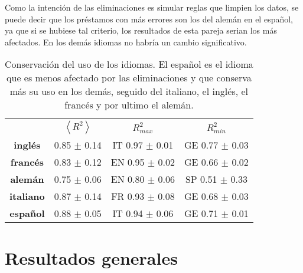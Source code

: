 Como la intención de las eliminaciones es simular reglas que limpien los datos, se puede decir que los préstamos con más errores son los del alemán en el español, ya que si se hubiese tal criterio, los resultados de esta pareja serian los más afectados. En los demás idiomas no habría un cambio significativo. 


 


 



\begin{table}
	\centering
	\begin{tabular}{cccc}
		\textbf{} & \textbf{$\left \langle R^{2} \right \rangle$} & \textbf{$R^{2}_{max}$} & \textbf{$R^{2}_{min}$} \\
		\textbf{inglés}   & 0.85 $\pm$ 0.14   &  IT 0.97 $\pm$ 0.01  & GE 0.77 $\pm$ 0.03  \\
		\textbf{francés}  & 0.83 $\pm$ 0.12   &  EN 0.95 $\pm$ 0.02  & GE 0.66 $\pm$ 0.02  \\
		\textbf{alemán}   & 0.75 $\pm$ 0.06   &  EN 0.80 $\pm$ 0.06  & SP 0.51 $\pm$ 0.33  \\
		\textbf{italiano} & 0.87 $\pm$ 0.14   &  FR 0.93 $\pm$ 0.08  & GE 0.68 $\pm$ 0.03  \\
		\textbf{español}  & 0.88 $\pm$ 0.05   &  IT 0.94 $\pm$ 0.06  & GE 0.71 $\pm$ 0.01                                                               
	\end{tabular}
	\caption{Conservación del uso de los idiomas. El español es el idioma que es menos afectado por las eliminaciones y que conserva más su uso en los demás, seguido del italiano, el inglés, el francés y por ultimo el alemán.}
	\label{tab.conservacion}
\end{table}





\section{Resultados generales}

